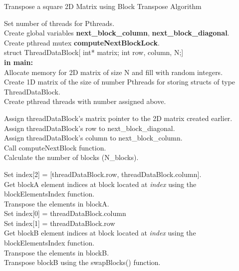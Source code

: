 \documentclass[10pt, onecolumn]{article}
\begin{document}
\begin{algorithm}[H]
   \label{Alg:PThreadBlockAlgorithm1}
    \caption{Transpose a square 2D Matrix using Block Transpose Algorithm}
    Set number of threads for Pthreads.\\
    Create global variables \textbf{next\_block\_column}, \textbf{next\_block\_diagonal}. \\
    Create pthread mutex \textbf{computeNextBlockLock}. \\
    struct ThreadDataBlock[ int* matrix; int row, column, N;] \\
    \textbf{in main:} \\
    Allocate memory for 2D matrix of size N and fill with random integers. \\
    Create 1D matrix of the size of number Pthreads for storing structs of type ThreadDataBlock. \\
    Create pthread threads with number assigned above.\\
    {   
        Assign threadDataBlock's matrix pointer to the 2D matrix created earlier.\\
        Assign threadDataBlock's row to next\_block\_diagonal.\\
        Assign threadDataBlock's column to next\_block\_column.\\
        Call computeNextBlock function.\\
        Calculate the number of blocks (N\_blocks).\\
        {
            Set index[2] = [threadDataBlock.row, threadDataBlock.column]. \\
            Get blockA element indices at block located at \emph{index} using the blockElementsIndex function.\\
            Transpose the elements in blockA.\\
            {       
                Set index[0] = threadDataBlock.column\\ 
                Set index[1] = threadDataBlock.row \\
                Get blockB element indices at block located at \emph{index} using the blockElementsIndex function.\\
                Transpose the elements in blockB.\\
                Transpose blockB using the swapBlocks() function.
            }
            
}}
\end{algorithm}
\end{document}
